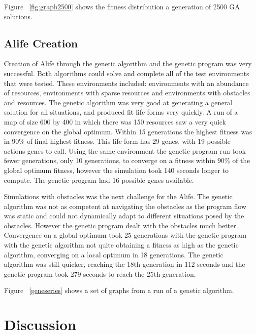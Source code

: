 \documentclass[12pt]{article}
\begin{document}
Figure ~\ref{fig:graph2500} shows the fitness distribution a generation of 2500 GA solutions. 

\subsection{Alife Creation}

Creation of Alife through the genetic algorithm and the genetic program was very successful. Both algorithms could solve and complete all of the test
environments that were tested. These environments included: environments with an abundance of resources, environments with sparse resources and 
environments with obstacles and resources. The genetic algorithm was very good at generating a general solution for all situations, and produced fit life forms
very quickly. A run of a map of size 600 by 400 in which there was 150 resources saw a very quick convergence on the global optimum. Within 
15 generations the highest fitness was in 90\% of final highest fitness. This life form has 29 genes, with 19 possible actions genes to call.
Using the same environment the genetic program run took fewer generations, only 10 generations, to converge on a fitness within 90\% of the
global optimum fitness, however the simulation took 140 seconds longer to compute. The genetic program had 16 possible genes available. 

Simulations with obstacles was the next challenge for the Alife. The genetic algorithm was not as competent at navigating the obstacles as the
program flow was static and could not dynamically adapt to different situations posed by the obstacles. However the genetic program dealt with
the obstacles much better. Convergence on a global optimum took 25 generations with the genetic program with the genetic algorithm not quite obtaining
a fitness as high as the genetic algorithm, converging on a local optimum in 18 generations. The genetic algorithm was still quicker, reaching the 18th generation
in 112 seconds and the genetic program took 279 seconds to reach the 25th generation.

Figure ~\ref{geneseries} shows a set of graphs from a run of a genetic algorithm. 




\section{Discussion}
\end{document}

